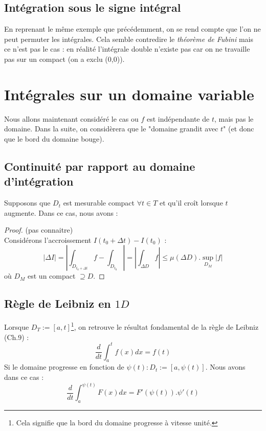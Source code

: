 \documentclass[british,french,11pt, a4paper, openany]{book}
\begin{document}
									
		\subsection{Intégration sous le signe intégral}
		En reprenant le même exemple que précédemment, on se rend compte que l'on ne peut permuter les intégrales. Cela semble contredire le \textit{théorème de Fubini} mais ce n'est pas le cas : en réalité l'intégrale double n'existe pas car on ne travaille pas sur un compact (on a exclu (0,0)). 
									
		\section{Intégrales sur un domaine variable}
		Nous allons maintenant considéré le cas ou $f$ est indépendante de $t$, mais pas le domaine. Dans la suite, on considèrera que le "domaine grandit avec $t$" (et donc que le bord du domaine bouge).
									
		\subsection{Continuité par rapport au domaine d'intégration}
		Supposons que $D_t$ est mesurable compact $\forall t \in T$ et qu'il croît lorsque $t$ augmente. Dans ce cas, nous avons :\\
		\begin{proof}(pas connaitre)\\
			Considérons l'accroissement $I(t_0 + \Delta t) - I(t_0)$ :
			$$|\Delta I| = \left|\int_{D_{t_0 + \Delta t}} f - \int_{D_{t_0}}\right| = \left|\int_{\Delta D} f \right| \leq \mu(\Delta D).\sup\limits_{D_M}|f|$$
			où $D_M$ est un compact $\supseteq D$.
		\end{proof}
									
		\subsection{Règle de Leibniz en $1D$}
		Lorsque $D_T := [a,t]$\footnote{Cela signifie que la bord du domaine progresse à vitesse unité.}, on retrouve le résultat fondamental de la règle de Leibniz (Ch.9) :
		\begin{equation}
			\frac{d}{dt}\int_a^t f(x)dx = f(t)
		\end{equation}
		Si le domaine progresse en fonction de $\psi(t) : D_t := [a, \psi(t)]$. Nous avons dans ce cas : 
		\begin{equation}
			\frac{d}{dt}\int_a^{\psi(t)} F(x) dx = F'(\psi(t)).\psi'(t)
		\end{equation}
									
\end{document}
